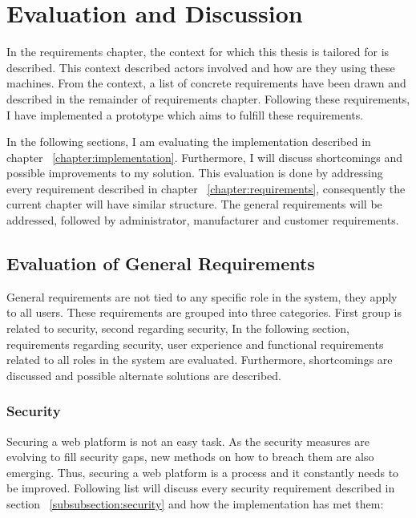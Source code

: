 \chapter{Evaluation and Discussion}
\label{chapter:evaluation}

In the requirements chapter, the context for which this thesis is tailored for is described. This context described actors involved and how are they using these machines. From the context, a list of concrete requirements have been drawn and described in the remainder of requirements chapter. Following these requirements, I have implemented a prototype which aims to fulfill these requirements.

In the following sections, I am evaluating the implementation described in chapter ~\ref{chapter:implementation}. Furthermore, I will discuss shortcomings and possible improvements to my solution. This evaluation is done by addressing every requirement described in chapter ~\ref{chapter:requirements}, consequently the current chapter will have similar structure. The general requirements will be addressed, followed by administrator, manufacturer and customer requirements.

\section{Evaluation of General Requirements}

General requirements are not tied to any specific role in the system, they apply to all users. These requirements are grouped into three categories. First group is related to security, second  regarding security, In the following section, requirements regarding security, user experience and functional requirements related to all roles in the system are evaluated. Furthermore, shortcomings are discussed and possible alternate solutions are described.

\subsection{Security}

Securing a web platform is not an easy task. As the security measures are evolving to fill security gaps, new methods on how to breach them are also emerging. Thus, securing a web platform is a process and it constantly needs to be improved. Following list will discuss every security requirement described in section ~\ref{subsubsection:security} and how the implementation has met them:

